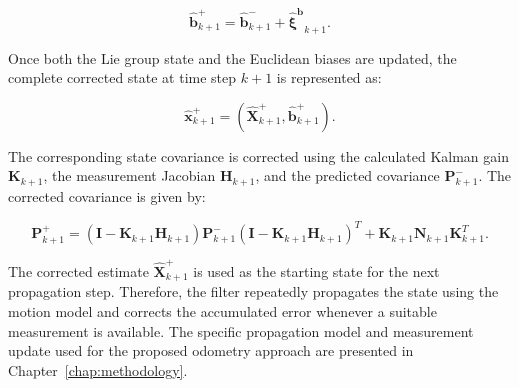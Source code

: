\documentclass[report.tex]{subfiles}
\begin{document}
\begin{equation}
    \hat{\boldsymbol{b}}^{+}_{k+1}
    =
    \hat{\boldsymbol{b}}^{-}_{k+1}
    +
    \boldsymbol{\hat \xi^{b}}_{k+1}.
    \label{eq:inekfBiasCorrectionBackground}
\end{equation}

Once both the Lie group state and the Euclidean biases are updated, the complete corrected state at time step $k+1$ is represented as:

\begin{equation}
    \hat{\boldsymbol{x}}^{+}_{k+1}
    =
    \left(
        \hat{\boldsymbol{X}}^{+}_{k+1},
        \hat{\boldsymbol{b}}^{+}_{k+1}
    \right).
    \label{eq:inekfCompleteStateCorrectionBackground}
\end{equation}

The corresponding state covariance is corrected using the calculated Kalman gain $\boldsymbol{K}_{k+1}$, the measurement Jacobian $\boldsymbol{H}_{k+1}$, and the predicted covariance $\boldsymbol{P}^{-}_{k+1}$. The corrected covariance is given by:

\begin{equation}
    \boldsymbol{P}^{+}_{k+1}
    =
    \left(
        \boldsymbol{I}
        -
        \boldsymbol{K}_{k+1}
        \boldsymbol{H}_{k+1}
    \right)
    \boldsymbol{P}^{-}_{k+1}
    \left(
        \boldsymbol{I}
        -
        \boldsymbol{K}_{k+1}
        \boldsymbol{H}_{k+1}
    \right)^{T}
    +
    \boldsymbol{K}_{k+1}
    \boldsymbol{N}_{k+1}
    \boldsymbol{K}_{k+1}^{T}.
    \label{eq:inekfCovarianceCorrectionBackground}
\end{equation}

The corrected estimate $\hat{\boldsymbol{X}}^{+}_{k+1}$ is used as the starting state for the next propagation step. Therefore, the filter repeatedly propagates the state using the motion model and corrects the accumulated error whenever a suitable measurement is available. The specific propagation model and measurement update used for the proposed odometry approach are presented in Chapter~\ref{chap:methodology}.
\end{document}
